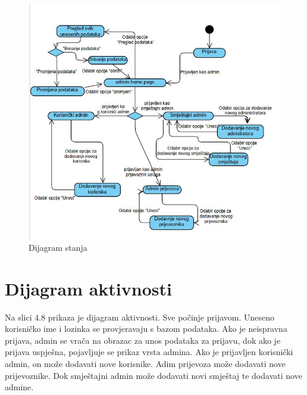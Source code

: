 			\begin{figure}[H]
				\includegraphics[width=\linewidth]{slike/Dijagram stanja.JPG}
				\centering
				\caption{Dijagram stanja}
				\label{fig:Dijagram stanja}
			\end{figure}

			\eject 
		
		\section{Dijagram aktivnosti}

		{Na slici 4.8 prikaza je dijagram aktivnosti. Sve počinje prijavom. Uneseno korisničko ime i lozinka se provjeravaju s bazom podataka. Ako je neispravna prijava, admin se vrača na obrazac za unos podataka za prijavu, dok ako je prijava uspješna, pojavljuje se prikaz vrsta admina.
		Ako je prijavljen korisnički admin, on može dodavati nove korisnike. Adim prijevoza može dodavati nove prijevoznike. Dok smještajni admin može dodavati novi smještaj te dodavati nove admine.}
			
